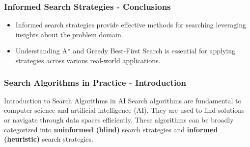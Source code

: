 \documentclass[aspectratio=169]{beamer}
\begin{document}
\begin{frame}[fragile]
    \frametitle{Informed Search Strategies - Conclusions}
    \begin{itemize}
        \item Informed search strategies provide effective methods for searching leveraging insights about the problem domain.
        \item Understanding A* and Greedy Best-First Search is essential for applying strategies across various real-world applications.
    \end{itemize}
\end{frame}

\begin{frame}[fragile]
    \frametitle{Search Algorithms in Practice - Introduction}
    \begin{block}{Introduction to Search Algorithms in AI}
        Search algorithms are fundamental to computer science and artificial intelligence (AI). 
        They are used to find solutions or navigate through data spaces efficiently. 
        These algorithms can be broadly categorized into 
        \textbf{uninformed (blind)} search strategies and 
        \textbf{informed (heuristic)} search strategies.
    \end{block}
\end{frame}
\end{document}
